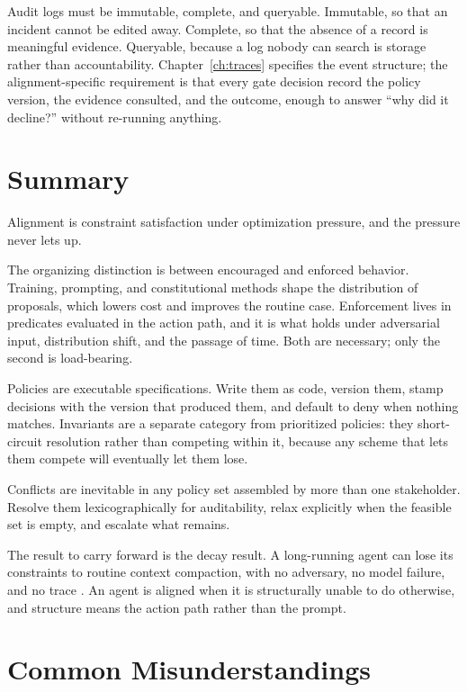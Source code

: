 \documentclass[11pt]{book}
\begin{document}
Audit logs must be immutable, complete, and queryable. Immutable, so that an incident cannot be edited away. Complete, so that the absence of a record is meaningful evidence. Queryable, because a log nobody can search is storage rather than accountability. Chapter~\ref{ch:traces} specifies the event structure; the alignment-specific requirement is that every gate decision record the policy version, the evidence consulted, and the outcome, enough to answer ``why did it decline?'' without re-running anything.

\section{Summary}

Alignment is constraint satisfaction under optimization pressure, and the pressure never lets up.

The organizing distinction is between encouraged and enforced behavior. Training, prompting, and constitutional methods shape the distribution of proposals, which lowers cost and improves the routine case. Enforcement lives in predicates evaluated in the action path, and it is what holds under adversarial input, distribution shift, and the passage of time. Both are necessary; only the second is load-bearing.

Policies are executable specifications. Write them as code, version them, stamp decisions with the version that produced them, and default to deny when nothing matches. Invariants are a separate category from prioritized policies: they short-circuit resolution rather than competing within it, because any scheme that lets them compete will eventually let them lose.

Conflicts are inevitable in any policy set assembled by more than one stakeholder. Resolve them lexicographically for auditability, relax explicitly when the feasible set is empty, and escalate what remains.

The result to carry forward is the decay result. A long-running agent can lose its constraints to routine context compaction, with no adversary, no model failure, and no trace \cite{govdecay2026}. An agent is aligned when it is structurally unable to do otherwise, and structure means the action path rather than the prompt.

\section{Common Misunderstandings}
\end{document}
